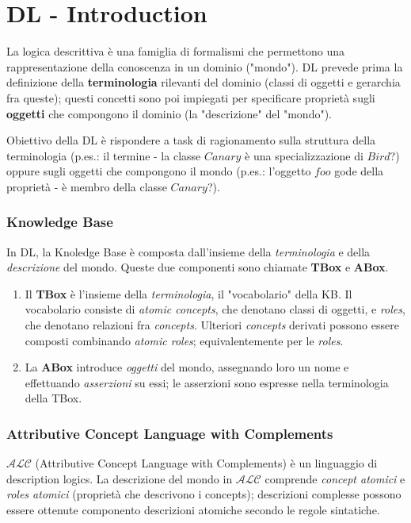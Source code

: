 \chapter{DL - Introduction}

La logica descrittiva è una famiglia di formalismi che permettono una rappresentazione della conoscenza in un dominio ("mondo"). DL prevede prima la definizione della \textbf{terminologia} rilevanti del dominio (classi di oggetti e gerarchia fra queste); questi concetti sono poi impiegati per specificare proprietà sugli \textbf{oggetti} che compongono il dominio (la "descrizione" del "mondo").

Obiettivo della DL è rispondere a task di ragionamento sulla struttura della terminologia (p.es.: il termine - la classe $Canary$ è una specializzazione di $Bird$?) oppure sugli oggetti che compongono il mondo (p.es.: l'oggetto $foo$ gode della proprietà - è membro della classe $Canary$?).

\subsection{Knowledge Base}

In DL, la Knoledge Base è composta dall'insieme della \textit{terminologia} e della \textit{descrizione} del mondo. Queste due componenti sono chiamate \textbf{TBox} e \textbf{ABox}.
\begin{enumerate}
\item Il \textbf{TBox} è l'insieme della \textit{terminologia}, il "vocabolario" della KB. Il vocabolario consiste di \textit{atomic concepts}, che denotano classi di oggetti, e \textit{roles}, che denotano relazioni fra \textit{concepts}. Ulteriori \textit{concepts} derivati possono essere composti combinando \textit{atomic roles}; equivalentemente per le \textit{roles}.
\item La \textbf{ABox} introduce \textit{oggetti} del mondo, assegnando loro un nome e effettuando \textit{asserzioni} su essi; le asserzioni sono espresse nella terminologia della TBox.
\end{enumerate}

\subsection{Attributive Concept Language with Complements}
$\mathcal{ALC}$ (Attributive Concept Language with Complements) è un linguaggio di description logics. La descrizione del mondo in $\mathcal{ALC}$ comprende \textit{concept atomici} e \textit{roles atomici} (proprietà che descrivono i concepts); descrizioni complesse possono essere ottenute componento descrizioni atomiche secondo le regole sintatiche.

